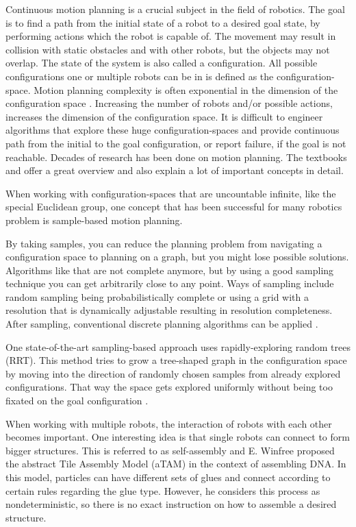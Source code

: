 Continuous motion planning is a crucial subject in the field of robotics.
The goal is to find a path from the initial state of a robot to a desired goal state, by performing actions which the robot is capable of.
The movement may result in collision with static obstacles and with other robots, but the objects may not overlap.
The state of the system is also called a configuration.
All possible configurations one or multiple robots can be in is defined as the configuration-space.
Motion planning complexity is often exponential in the dimension of the configuration space \cite{LaValle2006}.
Increasing the number of robots and/or possible actions, increases the dimension of the configuration space.
It is difficult to engineer algorithms that explore these huge configuration-spaces and provide continuous path from the initial to the goal configuration, or report failure, if the goal is not reachable.
Decades of research has been done on motion planning.
The textbooks \cite{LaValle2006} and \cite{Mueller2019} offer a great overview and also explain a lot of important concepts in detail.

When working with configuration-spaces that are uncountable infinite, like the special Euclidean group, one concept that has been successful for many robotics problem is sample-based motion planning.

By taking samples, you can reduce the planning problem from navigating a configuration space to planning on a graph, but you might lose possible solutions.
Algorithms like that are not complete anymore, but by using a good sampling technique you can get arbitrarily close to any point.
Ways of sampling include random sampling being probabilistically complete or using a grid with a resolution that is dynamically adjustable resulting in resolution completeness.
After sampling, conventional discrete planning algorithms can be applied \cite{LaValle2006}.

One state-of-the-art sampling-based approach uses rapidly-exploring random trees (RRT).
This method tries to grow a tree-shaped graph in the configuration space by moving into the direction of randomly chosen samples from already explored configurations. That way the space gets explored uniformly without being too fixated on the goal configuration \cite{lavalle1998,lavalle2001}.

When working with multiple robots, the interaction of robots with each other becomes important.
One interesting idea is that single robots can connect to form bigger structures.
This is referred to as self-assembly and E. Winfree \cite{winfree1998} proposed the abstract Tile Assembly Model (aTAM) in the context of assembling DNA.
In this model, particles can have different sets of glues and connect according to certain rules regarding the glue type.
However, he considers this process as nondeterministic, so there is no exact instruction on how to assemble a desired structure.

